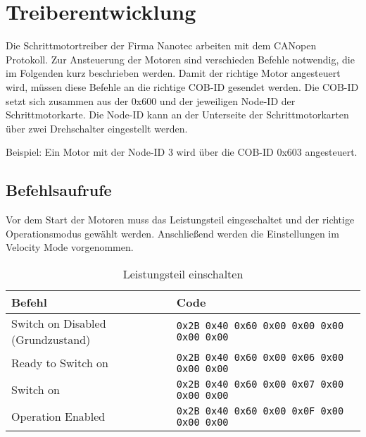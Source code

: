 

\section{Treiberentwicklung}
\label{sec:Treiber}

Die Schrittmotortreiber der Firma Nanotec arbeiten mit dem CANopen Protokoll. Zur Ansteuerung der Motoren sind verschieden Befehle notwendig, die im Folgenden kurz beschrieben werden. Damit der richtige Motor angesteuert wird, müssen diese Befehle an die richtige COB-ID gesendet werden. Die COB-ID setzt sich zusammen aus der 0x600 und der jeweiligen Node-ID der Schrittmotorkarte. Die Node-ID kann an der Unterseite der Schrittmotorkarten über zwei Drehschalter eingestellt werden. 

Beispiel: 
Ein Motor mit der Node-ID 3 wird über die COB-ID 0x603 angesteuert.


\subsection*{Befehlsaufrufe}

Vor dem Start der Motoren muss das Leistungsteil eingeschaltet und der richtige Operationsmodus gewählt werden. Anschließend werden die Einstellungen im Velocity Mode vorgenommen. 

\begin{table}[H]
    \begin{tabularx}{\textwidth}{@{}Xl@{}} \toprule
    
 
    Befehl & Code \\
    \midrule
    
    Switch on Disabled (Grundzustand)  &
    \lstinline{0x2B 0x40 0x60 0x00 0x00 0x00 0x00 0x00} \\

    Ready to Switch on  &
    \lstinline{0x2B 0x40 0x60 0x00 0x06 0x00 0x00 0x00} \\

   Switch on  &
    \lstinline{0x2B 0x40 0x60 0x00 0x07 0x00 0x00 0x00} \\
    
    Operation Enabled  &
    \lstinline{0x2B 0x40 0x60 0x00 0x0F 0x00 0x00 0x00} \\

    \bottomrule
    \end{tabularx}
    \caption{Leistungsteil einschalten}
\end{table}


